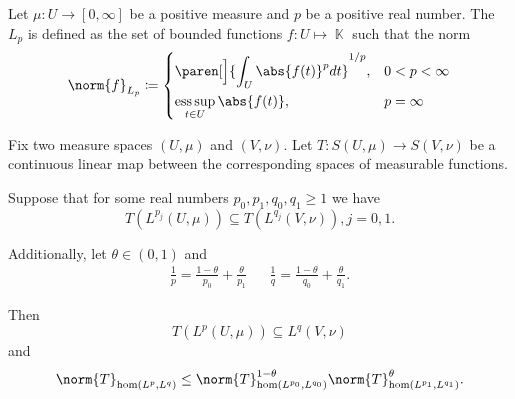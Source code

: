 \begin{definition}\label{def:lebesgue_space}\cite[6]{Bergh1976}
  Let \( \mu: U \to [0, \infty] \) be a positive measure and \( p \) be a positive real number. The  \( L_p \) is defined as the set of bounded functions \( f: U \mapsto \BbbK \) such that the norm
  \begin{equation*}
    \norm{f}_{L_p} \coloneqq \begin{dcases}
      \paren[\Big]{\int_U \abs{f(t)}^p dt}^{1/p}, &0 < p < \infty \\
      \ess\sup_{t \in U} \abs{f(t)} , &p = \infty
    \end{dcases}
  \end{equation*}
\end{definition}

\begin{theorem}\label{thm:riesz_thorin}\mcite\cite[24]{Bergh1976}
  Fix two measure spaces \( (U, \mu) \) and \( (V, \nu) \). Let \( T: S(U, \mu) \to S(V, \nu) \) be a continuous linear map between the corresponding spaces of measurable functions.

  Suppose that for some real numbers \( p_0, p_1, q_0, q_1 \geq 1 \) we have
  \begin{equation*}
    T(L^{p_j}(U, \mu)) \subseteq T(L^{q_j}(V, \nu)), j = 0, 1.
  \end{equation*}

  Additionally, let \( \theta \in (0, 1) \) and
  \begin{align*}
    \frac 1 p = \frac {1 - \theta} {p_0} + \frac {\theta} {p_1}
    &&
    \frac 1 q = \frac {1 - \theta} {q_0} + \frac {\theta} {q_1}.
  \end{align*}

  Then
  \begin{equation*}
    T(L^p(U, \mu)) \subseteq L^q(V, \nu)
  \end{equation*}
  and
  \begin{equation*}
    \norm{T}_{\hom(L^p, L^q)} \leq \norm{T}_{\hom(L^{p_0}, L^{q_0})}^{1 - \theta} \norm{T}_{\hom(L^{p_1}, L^{q_1})}^\theta.
  \end{equation*}
\end{theorem}

